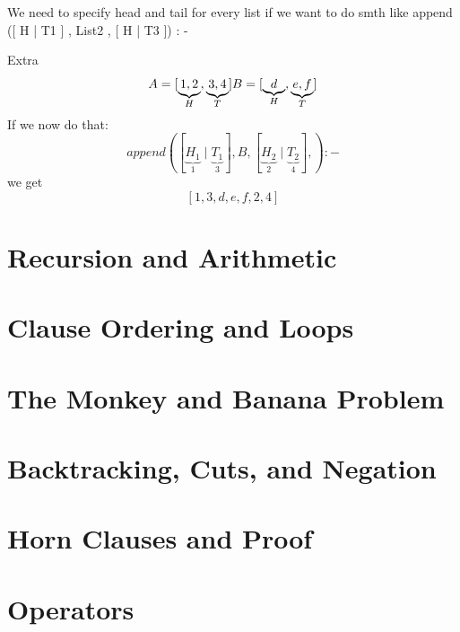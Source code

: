 
We need to specify head and tail for every list if we want to do smth like append ([ H | T1 ] , List2 , [ H | T3 ]) : -

\begin{bsp} Extra
\[
    A =  [ \underbrace{1,2}_{H}, \underbrace{3,4}_{T} ] \\
    B =  [ \underbrace{d}_{H}, \underbrace{e,f}_{T} ]
\]
If we now do that:
\[
    append([\underbrace{H_1}_{1} \mid  \underbrace{T_1}_{3}], B, [\underbrace{H_2}_{2} \mid  \underbrace{T_2}_{4}],) :-
\]
we get
\[
    [1,3,d,e,f,2,4]
\]
\end{bsp}


\section{Recursion and Arithmetic}



\section{Clause Ordering and Loops}

\section{The Monkey and Banana Problem}

\section{Backtracking, Cuts, and Negation}

\section{Horn Clauses and Proof}

\section{Operators}


